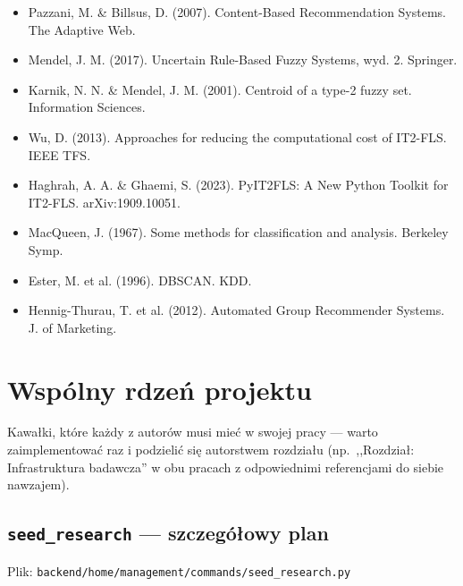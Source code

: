 \documentclass[a4paper,11pt]{article}
\newcommand{\code}[1]{\texttt{\small #1}}
\begin{document}
\begin{itemize}[leftmargin=1.5em,itemsep=1pt]
  \item Pazzani, M. \& Billsus, D. (2007). Content-Based Recommendation Systems. The Adaptive Web.
  \item Mendel, J. M. (2017). Uncertain Rule-Based Fuzzy Systems, wyd. 2. Springer.
  \item Karnik, N. N. \& Mendel, J. M. (2001). Centroid of a type-2 fuzzy set. Information Sciences.
  \item Wu, D. (2013). Approaches for reducing the computational cost of IT2-FLS. IEEE TFS.
  \item Haghrah, A. A. \& Ghaemi, S. (2023). PyIT2FLS: A New Python Toolkit for IT2-FLS. arXiv:1909.10051.
  \item MacQueen, J. (1967). Some methods for classification and analysis. Berkeley Symp.
  \item Ester, M. et al. (1996). DBSCAN. KDD.
  \item Hennig-Thurau, T. et al. (2012). Automated Group Recommender Systems. J. of Marketing.
\end{itemize}

\newpage
\section{Wspólny rdzeń projektu}

Kawałki, które każdy z autorów musi mieć w swojej pracy --- warto zaimplementować raz i podzielić się autorstwem rozdziału (np.\ ,,Rozdział: Infrastruktura badawcza'' w obu pracach z odpowiednimi referencjami do siebie nawzajem).

\subsection{\texttt{seed\_research} --- szczegółowy plan}

Plik: \code{backend/home/management/commands/seed\_research.py}
\end{document}

